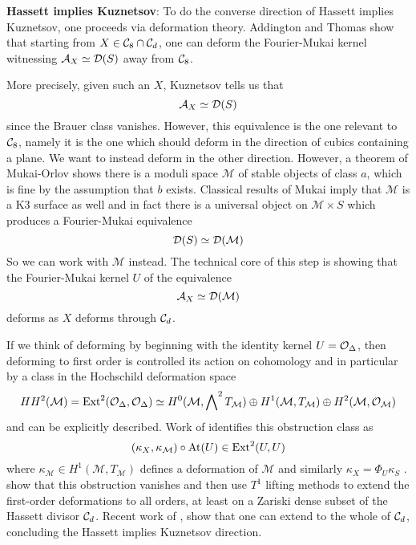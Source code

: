 \textbf{Hassett implies Kuznetsov}: To do the converse direction of Hassett implies Kuznetsov, one proceeds via deformation theory. Addington and Thomas show that starting from $X\in \mathcal{C}_8\cap \mathcal{C}_d$, one can deform the Fourier-Mukai kernel witnessing $\mathcal{A}_X\simeq \mathcal{D}(S)$ away from $\mathcal{C}_8$. 

More precisely, given such an $X$, Kuznetsov tells us that $$\mathcal{A}_X \simeq \mathcal{D}(S)$$ since the Brauer class vanishes. However, this equivalence is the one relevant to $\mathcal{C}_8$, namely it is the one which should deform in the direction of cubics containing a plane. We want to instead deform in the other direction. However, a theorem of Mukai-Orlov shows there is a moduli space $\mathcal{M}$ of stable objects of class $a$, which is fine by the assumption that $b$ exists. Classical results of Mukai imply that $\mathcal{M}$ is a K3 surface as well and in fact there is a universal object on $\mathcal{M}\times S$ which produces a Fourier-Mukai equivalence $$\mathcal{D}(S)\simeq \mathcal{D}(\mathcal{M})$$
So we can work with $\mathcal{M}$ instead. The technical core of this step is showing that the Fourier-Mukai kernel $U$ of the equivalence $$\mathcal{A}_X \simeq \mathcal{D}(\mathcal{M})$$ deforms as $X$ deforms through $\mathcal{C}_d$. 

If we think of deforming by beginning with the identity kernel $U=\mathcal{O}_\Delta$, then deforming to first order is controlled its action on cohomology and in particular by a class in the Hochschild deformation space $$HH^2(\mathcal{M})=\operatorname{Ext}^2(\mathcal{O}_\Delta, \mathcal{O}_\Delta)\simeq H^0(\mathcal{M}, \bigwedge \nolimits^2 T_\mathcal{M})\oplus H^1 (\mathcal{M}, T_\mathcal{M})\oplus H^2(\mathcal{M}, \mathcal{O}_\mathcal{M}) $$
and can be explicitly described. Work of \cite{huybrechts_deformation-obstruction_2013} identifies this obstruction class as $$(\kappa_X, \kappa_\mathcal{M})\circ \mathrm{At}(U)\in \operatorname{Ext}^2(U,U)$$where $\kappa_{\mathcal{M}}\in H^1(\mathcal{M},T_{\mathcal{M}})$ defines a deformation of $\mathcal{M}$ and similarly $\kappa_X=\Phi_U \kappa_S$ . \cite{addington_hodge_2014} show that this obstruction vanishes and then use $T^1$ lifting methods to extend the first-order deformations to all orders, at least on a Zariski dense subset of the Hassett divisor $\mathcal{C}_d$. Recent work of \cite{li_derived_2022}, \cite{bayer_stability_2021} show that one can extend to the whole of $\mathcal{C}_d$, concluding the Hassett implies Kuznetsov direction.













